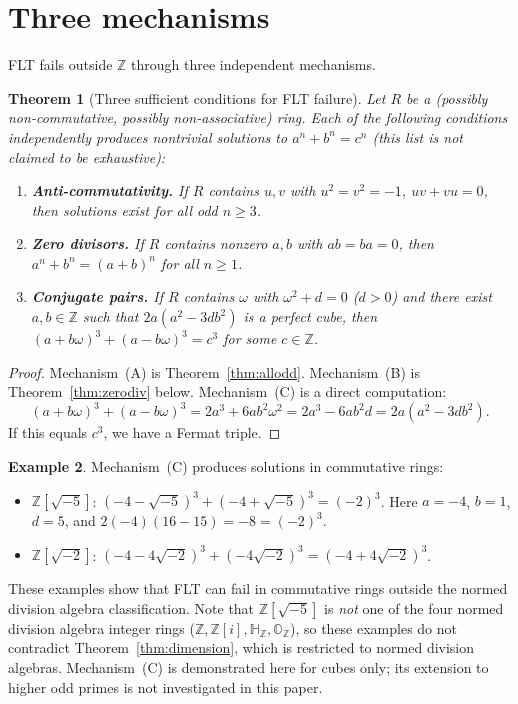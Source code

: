 \documentclass[11pt]{amsart}
\theoremstyle{plain}
\newtheorem{theorem}{Theorem}[section]
\theoremstyle{definition}
\newtheorem{example}[theorem]{Example}
\theoremstyle{remark}
\newcommand{\Z}{\mathbb{Z}}
\newcommand{\HH}{\mathbb{H}}
\newcommand{\OO}{\mathbb{O}}
\begin{document}

\section{Three mechanisms}\label{sec:mechanisms}

FLT fails outside $\Z$ through three independent mechanisms.

\begin{theorem}[Three sufficient conditions for FLT failure]\label{thm:mechanisms}
Let $R$ be a (possibly non-commutative, possibly non-associative) ring.
Each of the following conditions independently produces nontrivial
solutions to $a^n + b^n = c^n$ (this list is not claimed to be exhaustive):
\begin{enumerate}[label=(\Alph*)]
  \item \textbf{Anti-commutativity.}
    If $R$ contains $u, v$ with $u^2 = v^2 = -1$, $uv + vu = 0$,
    then solutions exist for all odd $n \geq 3$.
  \item \textbf{Zero divisors.}
    If $R$ contains nonzero $a, b$ with $ab = ba = 0$,
    then $a^n + b^n = (a+b)^n$ for all $n \geq 1$.
  \item \textbf{Conjugate pairs.}
    If $R$ contains $\omega$ with $\omega^2 + d = 0$ ($d > 0$) and there exist
    $a, b \in \Z$ such that $2a(a^2 - 3db^2)$ is a perfect cube,
    then $(a + b\omega)^3 + (a - b\omega)^3 = c^3$ for some $c \in \Z$.
\end{enumerate}
\end{theorem}

\begin{proof}
Mechanism~(A) is Theorem~\ref{thm:allodd}.
Mechanism~(B) is Theorem~\ref{thm:zerodiv} below.
Mechanism~(C) is a direct computation:
\[
  (a + b\omega)^3 + (a - b\omega)^3
  = 2a^3 + 6ab^2\omega^2
  = 2a^3 - 6ab^2 d
  = 2a(a^2 - 3db^2).
\]
If this equals $c^3$, we have a Fermat triple.
\end{proof}

\begin{example}
Mechanism~(C) produces solutions in commutative rings:
\begin{itemize}
  \item $\Z[\sqrt{-5}]$: $(-4 - \sqrt{-5})^3 + (-4 + \sqrt{-5})^3 = (-2)^3$.
    Here $a = -4$, $b = 1$, $d = 5$, and $2(-4)(16 - 15) = -8 = (-2)^3$.
  \item $\Z[\sqrt{-2}]$: $(-4 - 4\sqrt{-2})^3 + (-4\sqrt{-2})^3 = (-4 + 4\sqrt{-2})^3$.
\end{itemize}
These examples show that FLT can fail in commutative rings outside the
normed division algebra classification.
Note that $\Z[\sqrt{-5}]$ is \emph{not} one of the four normed division
algebra integer rings ($\Z, \Z[i], \HH_\Z, \OO_\Z$),
so these examples do not contradict
Theorem~\ref{thm:dimension}, which is restricted to normed division algebras.
Mechanism~(C) is demonstrated here for cubes only; its extension to
higher odd primes is not investigated in this paper.
\end{example}
\end{document}
